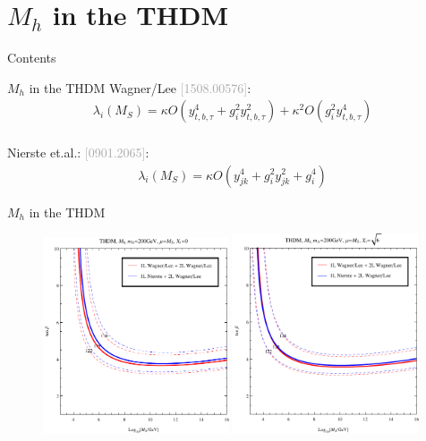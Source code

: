 \documentclass[hyperref={pdfpagelabels=false},ngerman]{beamer}
\newcommand{\bigcite}[1]{\textcolor{darkgray}{[#1]}}
\begin{document}

\section{$M_h$ in the THDM}

\begin{frame}{Contents}
  \tableofcontents[currentsection]  
\end{frame}

\begin{frame}{$M_h$ in the THDM}
  Wagner/Lee \bigcite{1508.00576}:\\
  \begin{align*}
    \lambda_i(M_S) = \kappa O(y_{t,b,\tau}^4 + g_i^2 y_{t,b,\tau}^2)
    + \kappa^2 O(g_i^2 y_{t,b,\tau}^4)
  \end{align*}
  \\[1em]
  Nierste et.al.: \bigcite{0901.2065}:\\
  \begin{align*}
    \lambda_i(M_S) = \kappa O(y_{jk}^4 + g_i^2 y_{jk}^2 + g_i^4)
  \end{align*}
\end{frame}

\begin{frame}{$M_h$ in the THDM}
  \begin{figure}
    \centering
    \includegraphics[width=0.49\textwidth]{plots/THDM/THDMIIMSSMBC_Xt-0_combined}
    \includegraphics[width=0.49\textwidth]{plots/THDM/THDMIIMSSMBC_Xt-Sqrt[6]_combined}
  \end{figure}
\end{frame}
\end{document}
